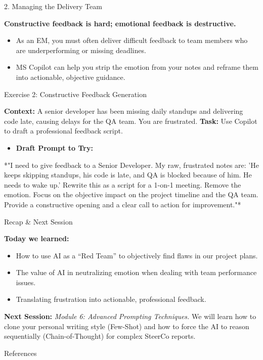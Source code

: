 \documentclass[aspectratio=169]{beamer}
\begin{document}
\begin{frame}[fragile]{2. Managing the Delivery Team}


\textbf{Constructive feedback is hard; emotional feedback is destructive.}

\begin{itemize}
  \item As an EM, you must often deliver difficult feedback to team members who are underperforming or missing deadlines.
  \item MS Copilot can help you strip the emotion from your notes and reframe them into actionable, objective guidance.
\end{itemize}
\end{frame}



\begin{frame}[fragile]{Exercise 2: Constructive Feedback Generation}


\textbf{Context:} A senior developer has been missing daily standups and delivering code late, causing delays for the QA team. You are frustrated.
\textbf{Task:} Use Copilot to draft a professional feedback script.

\begin{itemize}
  \item \textbf{Draft Prompt to Try:}
\end{itemize}
*"I need to give feedback to a Senior Developer. My raw, frustrated notes are: 'He keeps skipping standups, his code is late, and QA is blocked because of him. He needs to wake up.'
Rewrite this as a script for a 1-on-1 meeting. Remove the emotion. Focus on the objective impact on the project timeline and the QA team. Provide a constructive opening and a clear call to action for improvement."*

\end{frame}



\begin{frame}[fragile]{Recap \& Next Session}


\textbf{Today we learned:}
\begin{itemize}
  \item How to use AI as a ``Red Team'' to objectively find flaws in our project plans.
  \item The value of AI in neutralizing emotion when dealing with team performance issues.
  \item Translating frustration into actionable, professional feedback.
\end{itemize}
\textbf{Next Session:}
\textit{Module 6: Advanced Prompting Techniques.} We will learn how to clone your personal writing style (Few-Shot) and how to force the AI to reason sequentially (Chain-of-Thought) for complex SteerCo reports.
\end{frame}




\begin{frame}[allowframebreaks]{References}
  
  
\end{frame}
\end{document}
